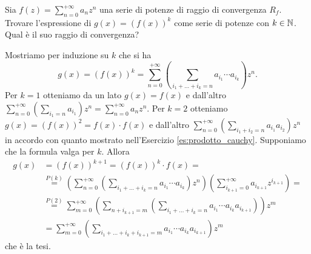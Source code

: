 \begin{es}
  Sia $ f(z) = \sum_{n = 0}^{+\infty} a_n z^n $ una serie di potenze di raggio di convergenza $ R_f $. Trovare l'espressione di $ g(x) = (f(x))^k $ come serie di potenze con $ k \in \mathbb{N} $. Qual è il suo raggio di convergenza?
\end{es}
%
Mostriamo per induzione su $ k $ che si ha
\begin{equation*}
  g(x) = (f(x))^k = \sum_{n = 0}^{+\infty} \left(\sum_{i_1 + \ldots + i_k = n} a_{i_1} \cdots a_{i_k}\right) z^n.
\end{equation*}
Per $ k = 1 $ otteniamo da un lato $ g(x) = f(x) $ e dall'altro $ \sum_{n = 0}^{+\infty} \left(\sum_{i_1= n} a_{i_1}\right) z^n = \sum_{n = 0}^{+\infty} a_n z^n $. Per $ k = 2 $ otteniamo $ g(x) = (f(x))^2 = f(x) \cdot f(x) $ e dall'altro $ \sum_{n = 0}^{+\infty} \left(\sum_{i_1 + i_2 = n} a_{i_1} a_{i_2}\right) z^n $ in accordo con quanto mostrato nell'Esercizio \ref{es:prodotto_cauchy}. Supponiamo che la formula valga per $ k $. Allora
\begin{align*}
  g(x) & = (f(x))^{k + 1} = (f(x))^k \cdot f(x) = \\
       & \overset{P(k)}{=} \left(\sum_{n = 0}^{+\infty} \left(\sum_{i_1 + \ldots + i_k = n} a_{i_1} \cdots a_{i_k}\right) z^n\right) \left(\sum_{i_{k + 1} = 0}^{+\infty} a_{i_{k + 1}} z^{i_{k + 1}}\right) = \\
       & \overset{P(2)}{=} \sum_{m = 0}^{+\infty} \left(\sum_{n + i_{k + 1} = m} \left(\sum_{i_1 + \ldots + i_k = n} a_{i_1} \cdots a_{i_k} a_{i_{k + 1}}\right)\right) z^m \\
       & = \sum_{m = 0}^{+\infty} \left(\sum_{i_1 + \ldots + i_k + i_{k + 1} = m} a_{i_1} \cdots a_{i_k} a_{i_{k + 1}}\right) z^m
\end{align*}
che è la tesi.

